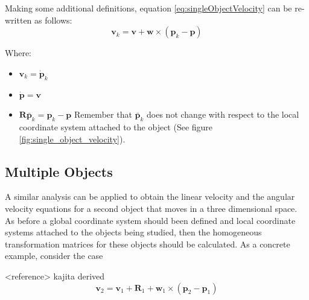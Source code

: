 \documentclass[a4paper]{report}
\begin{document}
Making some additional definitions, equation \eqref{eq:singleObjectVelocity} can
be re-written as follows:
\begin{equation}
    \boldsymbol{v}_k = \boldsymbol{v} + \boldsymbol{w} \times (\boldsymbol{p}_k - \boldsymbol{p})
\end{equation}

Where:
\begin{itemize}
    \item $\boldsymbol{v}_k = \boldsymbol{\dot{p}}_k$
    \item $\boldsymbol{\dot{p}} = \boldsymbol{v}$
    \item $\boldsymbol{R} \bar{\boldsymbol{p}}_k = \boldsymbol{p}_k - \boldsymbol{p}$
        Remember that $\bar{\boldsymbol{p}}_k$ does not change with respect to the
        local coordinate system attached to the object (See figure \ref{fig:single_object_velocity}).
\end{itemize}

\subsection{Multiple Objects}
A similar analysis can be applied to obtain the linear velocity and the angular
velocity equations for a second object that moves in a three dimensional
space. As before a global coordinate system should been defined and local coordinate
systems attached to the objects being studied, then the homogeneous transformation
matrices for these objects should be calculated. As a concrete example, consider
the case

<reference> kajita derived
\begin{equation}
    \boldsymbol{v}_2 = \boldsymbol{v}_1 + \boldsymbol{R}_1  + \boldsymbol{w}_1 \times (\boldsymbol{p}_2 - \boldsymbol{p}_1)
\end{equation}
\end{document}
